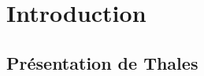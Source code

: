 \documentclass[12pt]{article}
\begin{document}

\tableofcontents
\pagebreak
\section{Introduction}
\subsection{Présentation de Thales}
\end{document}

